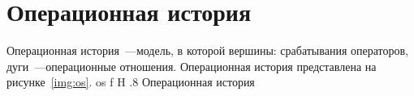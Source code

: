 \chapter{Операционная история}

Операционная история~---модель, в которой вершины: срабатывания операторов,
дуги~---операционные отношения.
Операционная история представлена на рисунке~\ref{img:os}.
	{os}
	{f}
	{H}
	{.8\textwidth}
	{Операционная история}
